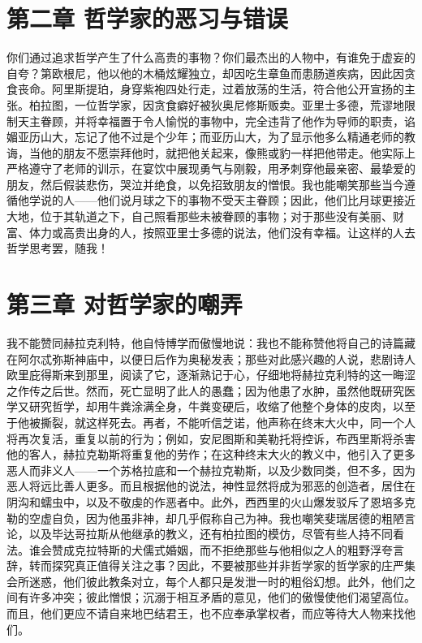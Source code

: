 
\section{第二章 哲学家的恶习与错误}

你们通过追求哲学产生了什么高贵的事物？你们最杰出的人物中，有谁免于虚妄的自夸？第欧根尼，他以他的木桶炫耀独立，却因吃生章鱼而患肠道疾病，因此因贪食丧命。阿里斯提珀，身穿紫袍四处行走，过着放荡的生活，符合他公开宣扬的主张。柏拉图，一位哲学家，因贪食癖好被狄奥尼修斯贩卖。亚里士多德，荒谬地限制天主眷顾，并将幸福置于令人愉悦的事物中，完全违背了他作为导师的职责，谄媚亚历山大，忘记了他不过是个少年；而亚历山大，为了显示他多么精通老师的教诲，当他的朋友不愿崇拜他时，就把他关起来，像熊或豹一样把他带走。他实际上严格遵守了老师的训示，在宴饮中展现勇气与刚毅，用矛刺穿他最亲密、最挚爱的朋友，然后假装悲伤，哭泣并绝食，以免招致朋友的憎恨。我也能嘲笑那些当今遵循他学说的人——他们说月球之下的事物不受天主眷顾；因此，他们比月球更接近大地，位于其轨道之下，自己照看那些未被眷顾的事物；对于那些没有美丽、财富、体力或高贵出身的人，按照亚里士多德的说法，他们没有幸福。让这样的人去哲学思考罢，随我！\par


\section{第三章 对哲学家的嘲弄}

我不能赞同赫拉克利特，他自恃博学而傲慢地说：我也不能称赞他将自己的诗篇藏在阿尔忒弥斯神庙中，以便日后作为奥秘发表；那些对此感兴趣的人说，悲剧诗人欧里庇得斯来到那里，阅读了它，逐渐熟记于心，仔细地将赫拉克利特的这一晦涩之作传之后世。然而，死亡显明了此人的愚蠢；因为他患了水肿，虽然他既研究医学又研究哲学，却用牛粪涂满全身，牛粪变硬后，收缩了他整个身体的皮肉，以至于他被撕裂，就这样死去。再者，不能听信芝诺，他声称在终末大火中，同一个人将再次复活，重复以前的行为；例如，安尼图斯和美勒托将控诉，布西里斯将杀害他的客人，赫拉克勒斯将重复他的劳作；在这种终末大火的教义中，他引入了更多恶人而非义人——一个苏格拉底和一个赫拉克勒斯，以及少数同类，但不多，因为恶人将远比善人更多。而且根据他的说法，神性显然将成为邪恶的创造者，居住在阴沟和蠕虫中，以及不敬虔的作恶者中。此外，西西里的火山爆发驳斥了恩培多克勒的空虚自负，因为他虽非神，却几乎假称自己为神。我也嘲笑斐瑞居德的粗陋言论，以及毕达哥拉斯从他继承的教义，还有柏拉图的模仿，尽管有些人持不同看法。谁会赞成克拉特斯的犬儒式婚姻，而不拒绝那些与他相似之人的粗野浮夸言辞，转而探究真正值得关注之事？因此，不要被那些并非哲学家的哲学家的庄严集会所迷惑，他们彼此教条对立，每个人都只是发泄一时的粗俗幻想。此外，他们之间有许多冲突；彼此憎恨；沉溺于相互矛盾的意见，他们的傲慢使他们渴望高位。而且，他们更应不请自来地巴结君王，也不应奉承掌权者，而应等待大人物来找他们。\par


